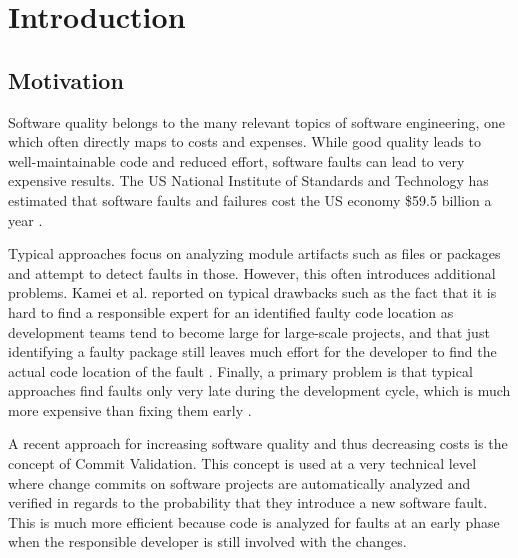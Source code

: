 \section{Introduction}
\label{sec:intro}

\subsection{Motivation}

Software quality belongs to the many relevant topics of software engineering, one which often directly maps to costs and expenses. While good quality leads to well-maintainable code and reduced effort, software faults can lead to very expensive results. The US National Institute of Standards and Technology has estimated that software faults and failures cost the US economy \$59.5 billion a year \cite{nist,Rosen2015}.

Typical approaches focus on analyzing module artifacts such as files or packages and attempt to detect faults in those. However, this often introduces additional problems. Kamei et al. reported on typical drawbacks such as the fact that it is hard to find a responsible expert for an identified faulty code location as development teams tend to become large for large-scale projects, and that just identifying a faulty package still leaves much effort for the developer to find the actual code location of the fault \cite{Kamei2013}. Finally, a primary problem is that typical approaches find faults only very late during the development cycle, which is much more expensive than fixing them early \cite{Martin08}.

A recent approach for increasing software quality and thus decreasing costs is the concept of Commit Validation. This concept is used at a very technical level where change commits on software projects are automatically analyzed and verified in regards to the probability that they introduce a new software fault. This is much more efficient because code is analyzed for faults at an early phase when the responsible developer is still involved with the changes. \cite{Kamei2013}

